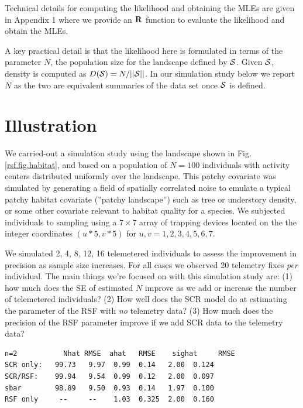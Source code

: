 Technical details for computing the likelihood and obtaining the MLEs
are given in Appendix 1 where we provide an ${\bf R}$ function to
evaluate the likelihood and obtain the MLEs.  

A key practical detail
is that the likelihood here is formulated in terms of the parameter
$N$, the population size for the landscape defined by ${\cal
  S}$. Given ${\cal S}$, density is computed as $D({\cal S}) =
N/||{\cal S}||$. In our simulation study below we report $N$ as the
two are equivalent summaries of the data set once ${\cal S}$ is
defined.


\section{Illustration}


We carried-out a simulation study using the landscape shown in
Fig. \ref{rsf.fig.habitat}, and based on a population of 
$N=100$ individuals with activity centers distributed uniformly over
the landscape.
This patchy covariate was simulated by
generating a field of spatially correlated noise to
emulate a typical patchy habitat covariate (''patchy landscape'') such as
tree or understory density, or some other covariate relevant to
habitat quality for a species. 
We subjected individuals to sampling using 
a $7 \times 7$ array of trapping devices located on the 
the integer coordinates $(u*5,v*5)$ for $u,v = 1,2,3,4,5,6,7$.

We simulated  2, 4, 8, 12, 16 telemetered individuals to assess the improvement in precision as sample size increases.
For all cases we observed
20 telemetry fixes {\it per} individual. 
The main things we're focused on with this simulation study are: 
(1) how much does the SE of estimated $N$ improve as we add or increase the number of
telemetered individuals?
(2) How well does the SCR model do at estimating the parameter of the RSF with {\it no} telemetry
data?
(3) How much does the precision of the RSF parameter improve if we add SCR data to the 
telemetry data?



\begin{verbatim}
n=2           Nhat RMSE  ahat   RMSE    sighat     RMSE
SCR only:   99.73   9.97  0.99  0.14   2.00  0.124
SCR/RSF:    99.94   9.54  0.99  0.12   2.00  0.097
sbar        98.89   9.50  0.93  0.14   1.97  0.100
RSF only     --     --    1.03  0.325  2.00  0.160
\end{verbatim}

